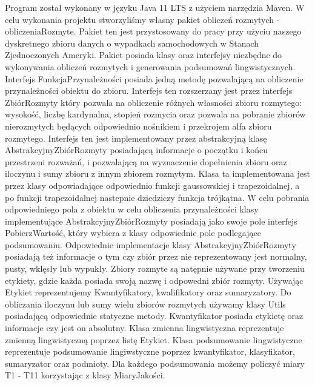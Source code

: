 \documentclass{classrep}
\begin{document}
Program został wykonany w języku Java 11 LTS z użyciem narzędzia Maven. W celu wykonania projektu stworzyliśmy własny pakiet obliczeń rozmytych - obliczeniaRozmyte. Pakiet ten jest przystosowany do pracy przy użyciu naszego dyskretnego zbioru danych o wypadkach samochodowych w Stanach Zjednoczonych Ameryki. Pakiet posiada klasy oraz interfejsy niezbędne do wykonywania obliczeń rozmytych i generowania podsumowań lingwistycznych. Interfejs FunkcjaPrzynależności posiada jedną metodę pozwalającą na obliczenie przynależności obiektu do zbioru\cite{broniarska}.
Interfejs ten rozszerzany jest przez interfejs ZbiórRozmyty który pozwala na obliczenie różnych własności zbioru rozmytego: wysokość\cite{fuzzy}, liczbę kardynalna\cite{fuzzy}, stopień rozmycia\cite{niewiadomski19} oraz pozwala na pobranie zbiorów nierozmytych będących odpowiednio nośnikiem\cite{broniarska} i przekrojem alfa zbioru rozmytego\cite{broniarska}. Interfejs ten jest implementowany przez abstrakcyjną klasę AbstrakcyjnyZbiórRozmyty posiadającą informacje o początku i końcu przestrzeni rozważań\cite{fuzzy}, i pozwalającą na wyznaczenie dopełnienia zbioru oraz iloczynu i sumy zbioru z innym zbiorem rozmytym\cite{fuzzy}. Klasa ta implementowana jest przez klasy odpowiadające odpowiednio funkcji gaussowskiej\cite{broniarska} i trapezoidalnej\cite{broniarska}, a po funkcji trapezoidalnej nastepnie dziedziczy funkcja trójkątna\cite{broniarska}. W celu pobrania odpowiedniego pola z obiektu w celu obliczenia przynależności klasy implementujące AbstrakcyjnyZbiórRozmyty posiadają jako swoje pole interfejs PobierzWartość, który wybiera z klasy odpowiednie pole podlegające podsumowaniu. Odpowiednie implementacje klasy AbstrakcyjnyZbiórRozmyty posiadają też informacje o tym czy zbiór przez nie reprezentowany jest normalny\cite{broniarska}, pusty\cite{broniarska}, wklęsły\cite{broniarska} lub wypukły\cite{broniarska}.
Zbiory rozmyte są natępnie używane przy tworzeniu etykiety\cite{niewiadomski19}, gdzie każda posiada swoją nazwę i odpowedni zbiór rozmyty. Używając Etykiet reprezentujemy Kwantyfikatory\cite{niewiadomski19}, kwalifikatory\cite{niewiadomski19} oraz sumaryzatory\cite{niewiadomski19}. Do obliczania iloczynu lub sumy wielu zbiorów rozmytych używamy klasy Utils posiadającą odpowiednie statyczne metody. Kwantyfikator posiada etykietę oraz informacje czy jest on absolutny\cite{niewiadomski19}. Klasa zmienna lingwistyczna reprezentuje zmienną lingwistyczną poprzez listę Etykiet. Klasa podsumowanie lingwistyczne reprezentuje podsumowanie lingiwstyczne poprzez kwantyfikator, klasyfikator, sumaryzator oraz podmioty. Dla każdego podsumowania możemy policzyć miary T1 - T11 korzystając z klasy MiaryJakości. \\
\end{document}
